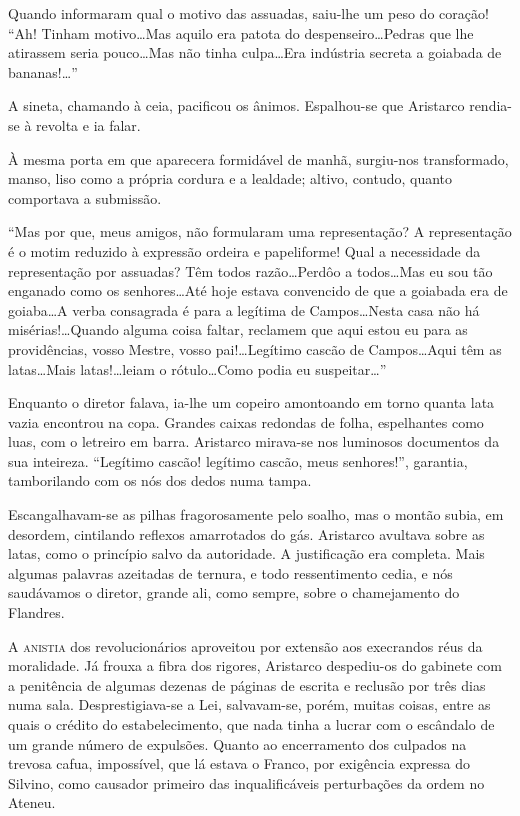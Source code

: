 
Quando informaram qual o motivo das assuadas, saiu{}-lhe um
peso do coração! ``Ah! Tinham motivo\ldots Mas aquilo era patota do
despenseiro\ldots Pedras que lhe atirassem seria pouco\ldots Mas não tinha
culpa\ldots Era indústria secreta a goiabada de bananas!\ldots'' 

A sineta, chamando à ceia, pacificou os ânimos. Espalhou{}-se que Aristarco
rendia{}-se à revolta e ia falar. 

À mesma porta em que aparecera
formidável de manhã, surgiu{}-nos transformado, manso, liso como a
própria cordura e a lealdade; altivo, contudo, quanto comportava a
submissão. 

``Mas por que, meus amigos, não formularam uma representação?
A representação é o motim
reduzido à expressão ordeira e papeliforme! Qual a necessidade da
representação por assuadas? Têm todos razão\ldots Perdôo a todos\ldots Mas
eu sou tão enganado como os senhores\ldots Até hoje estava convencido de
que a goiabada era de goiaba\ldots A verba consagrada é para a legítima de
Campos\ldots Nesta casa não há misérias!\ldots Quando alguma coisa faltar,
reclamem que aqui estou eu para as providências, vosso Mestre, vosso
pai!\ldots Legítimo cascão de Campos\ldots Aqui têm as latas\ldots Mais
latas!\ldots leiam o rótulo\ldots Como podia eu suspeitar\ldots'' 

Enquanto o diretor falava, ia{}-lhe um copeiro amontoando em torno quanta lata
vazia encontrou na copa. Grandes caixas redondas de folha, espelhantes
como luas, com o letreiro em barra. Aristarco mirava{}-se nos luminosos
documentos da sua inteireza. ``Legítimo cascão! legítimo cascão, meus
senhores!'', garantia, tamborilando com os nós dos dedos numa tampa.

Escangalhavam{}-se as pilhas fragorosamente pelo soalho, mas o montão
subia, em desordem, cintilando reflexos amarrotados do gás. Aristarco
avultava sobre as latas, como o princípio salvo da autoridade. A
justificação era completa. Mais algumas palavras azeitadas de ternura,
e todo ressentimento cedia, e nós saudávamos o diretor, grande ali,
como sempre, sobre o chamejamento do Flandres.

\sectionitem

\noindent\textsc{A anistia} dos revolucionários aproveitou por extensão aos execrandos
réus da moralidade. Já frouxa a fibra dos rigores, Aristarco
despediu{}-os do gabinete com a penitência de algumas dezenas de
páginas de escrita e reclusão por três dias numa sala.
Desprestigiava{}-se a Lei, salvavam{}-se, porém, muitas coisas, entre
as quais o crédito do estabelecimento, que nada tinha a lucrar com o
escândalo de um grande número de expulsões. Quanto ao encerramento dos
culpados na trevosa cafua, impossível, que lá estava o Franco, por
exigência expressa do Silvino, como causador primeiro das
inqualificáveis perturbações da ordem no Ateneu. 


